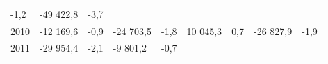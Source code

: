 \begin{longtable}[]{@{}lllllllll@{}}
\begin{minipage}[t]{0.06\columnwidth}
-1,2\strut
\end{minipage} & \begin{minipage}[t]{0.09\columnwidth}\raggedright
-49 422,8\strut
\end{minipage} & \begin{minipage}[t]{0.06\columnwidth}\raggedright
-3,7\strut
\end{minipage}\tabularnewline
\begin{minipage}[t]{0.05\columnwidth}\raggedright
2010\strut
\end{minipage} & \begin{minipage}[t]{0.10\columnwidth}\raggedright
-12 169,6\strut
\end{minipage} & \begin{minipage}[t]{0.06\columnwidth}\raggedright
-0,9\strut
\end{minipage} & \begin{minipage}[t]{0.16\columnwidth}\raggedright
-24 703,5\strut
\end{minipage} & \begin{minipage}[t]{0.06\columnwidth}\raggedright
-1,8\strut
\end{minipage} & \begin{minipage}[t]{0.12\columnwidth}\raggedright
10 045,3\strut
\end{minipage} & \begin{minipage}[t]{0.06\columnwidth}\raggedright
0,7\strut
\end{minipage} & \begin{minipage}[t]{0.09\columnwidth}\raggedright
-26 827,9\strut
\end{minipage} & \begin{minipage}[t]{0.06\columnwidth}\raggedright
-1,9\strut
\end{minipage}\tabularnewline
\begin{minipage}[t]{0.05\columnwidth}\raggedright
2011\strut
\end{minipage} & \begin{minipage}[t]{0.10\columnwidth}\raggedright
-29 954,4\strut
\end{minipage} & \begin{minipage}[t]{0.06\columnwidth}\raggedright
-2,1\strut
\end{minipage} & \begin{minipage}[t]{0.16\columnwidth}\raggedright
-9 801,2\strut
\end{minipage} & \begin{minipage}[t]{0.06\columnwidth}\raggedright
-0,7\strut
\end{minipage} & \begin{minipage}[t]{0.12\columnwidth}\raggedright

\end{minipage}
\end{longtable}
